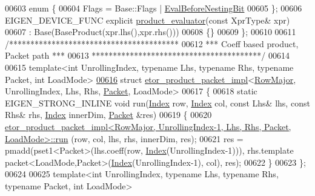 \begin{DoxyCode}
00603   \textcolor{keyword}{enum} \{
00604     Flags = Base::Flags | \hyperlink{group__flags_gaa34e83bae46a8eeae4e69ebe3aaecbed}{EvalBeforeNestingBit}
00605   \};
00606   EIGEN\_DEVICE\_FUNC \textcolor{keyword}{explicit} \hyperlink{struct_eigen_1_1internal_1_1product__evaluator}{product\_evaluator}(\textcolor{keyword}{const} XprType& xpr)
00607     : Base(BaseProduct(xpr.lhs(),xpr.rhs()))
00608   \{\}
00609 \};
00610 
00611 \textcolor{comment}{/****************************************}
00612 \textcolor{comment}{*** Coeff based product, Packet path  ***}
00613 \textcolor{comment}{****************************************/}
00614 
00615 \textcolor{keyword}{template}<\textcolor{keywordtype}{int} UnrollingIndex, \textcolor{keyword}{typename} Lhs, \textcolor{keyword}{typename} Rhs, \textcolor{keyword}{typename} Packet, \textcolor{keywordtype}{int} LoadMode>
\hyperlink{struct_eigen_1_1internal_1_1etor__product__packet__impl_3_01_row_major_00_01_unrolling_index_00_411b4c9bdf24490a5fcdbf8a014c4f10}{00616} \textcolor{keyword}{struct }\hyperlink{struct_eigen_1_1internal_1_1etor__product__packet__impl}{etor\_product\_packet\_impl}<\hyperlink{group__enums_ggaacded1a18ae58b0f554751f6cdf9eb13acfcde9cd8677c5f7caf6bd603666aae3}{RowMajor}, UnrollingIndex, Lhs, Rhs, 
      \hyperlink{union_eigen_1_1internal_1_1_packet}{Packet}, LoadMode>
00617 \{
00618   \textcolor{keyword}{static} EIGEN\_STRONG\_INLINE \textcolor{keywordtype}{void} run(\hyperlink{namespace_eigen_a62e77e0933482dafde8fe197d9a2cfde}{Index} row, \hyperlink{namespace_eigen_a62e77e0933482dafde8fe197d9a2cfde}{Index} col, \textcolor{keyword}{const} Lhs& lhs, \textcolor{keyword}{const} Rhs& rhs, 
      \hyperlink{namespace_eigen_a62e77e0933482dafde8fe197d9a2cfde}{Index} innerDim, \hyperlink{union_eigen_1_1internal_1_1_packet}{Packet} &res)
00619   \{
00620     
      \hyperlink{struct_eigen_1_1internal_1_1etor__product__packet__impl}{etor\_product\_packet\_impl<RowMajor, UnrollingIndex-1, Lhs, Rhs, Packet, LoadMode>::run}
      (row, col, lhs, rhs, innerDim, res);
00621     res =  pmadd(pset1<Packet>(lhs.coeff(row, \hyperlink{namespace_eigen_a62e77e0933482dafde8fe197d9a2cfde}{Index}(UnrollingIndex-1))), rhs.template 
      packet<LoadMode,Packet>(\hyperlink{namespace_eigen_a62e77e0933482dafde8fe197d9a2cfde}{Index}(UnrollingIndex-1), col), res);
00622   \}
00623 \};
00624 
00625 \textcolor{keyword}{template}<\textcolor{keywordtype}{int} UnrollingIndex, \textcolor{keyword}{typename} Lhs, \textcolor{keyword}{typename} Rhs, \textcolor{keyword}{typename} Packet, \textcolor{keywordtype}{int} LoadMode>

\end{DoxyCode}
